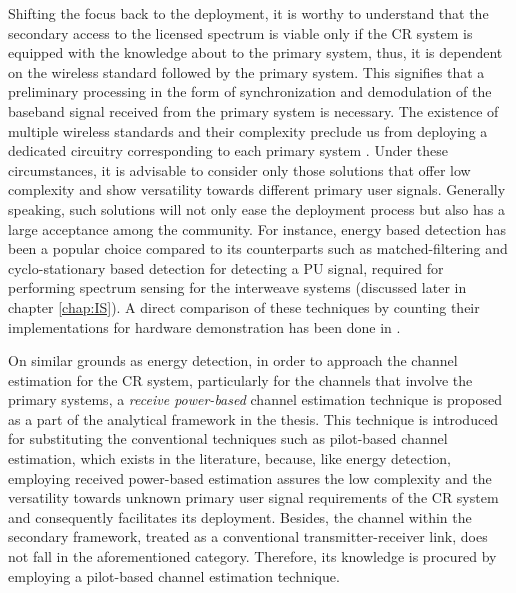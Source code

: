 Shifting the focus back to the deployment, it is worthy to understand that the secondary access to the licensed spectrum is viable only if the CR system is equipped with the knowledge about to the primary system, thus, it is dependent on the wireless standard followed by the primary system. This signifies that a preliminary processing in the form of synchronization and demodulation of the baseband signal received from the primary system is necessary. The existence of multiple wireless standards and their complexity preclude us from deploying a dedicated circuitry corresponding to each primary system \cite{Ghasemi08_cm}. Under these circumstances, it is advisable to consider only those solutions that offer low complexity and show versatility towards different primary user signals. Generally speaking, such solutions will not only ease the deployment process but also has a large acceptance among the community. For instance, energy based detection has been a popular choice compared to its counterparts such as matched-filtering and cyclo-stationary based detection for detecting a PU signal, required for performing spectrum sensing for the interweave systems (discussed later in chapter \ref{chap:IS}). A direct comparison of these techniques by counting their implementations for hardware demonstration has been done in \cite{Pawe11}. 

On similar grounds as energy detection, in order to approach the channel estimation for the CR system, particularly for the channels that involve the primary systems, a \textit{receive power-based} channel estimation technique is proposed as a part of the analytical framework in the thesis. This technique is introduced for substituting the conventional techniques such as pilot-based channel estimation, which exists in the literature, because, like energy detection, employing received power-based estimation assures the low complexity and the versatility towards unknown primary user signal requirements of the CR system and consequently facilitates its deployment. Besides, the channel within the secondary framework, treated as a conventional transmitter-receiver link, does not fall in the aforementioned category. Therefore, its knowledge is procured by employing a pilot-based channel estimation technique.


